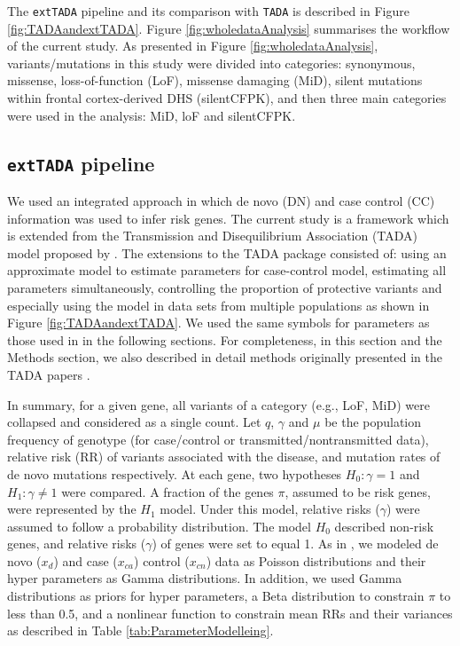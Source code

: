 \documentclass[]{article}
\begin{document}
The \texttt{extTADA} pipeline and its comparison with
\texttt{TADA} is described in Figure \ref{fig:TADAandextTADA}. Figure
\ref{fig:wholedataAnalysis} summarises the workflow of the
current study. As presented in  Figure \ref{fig:wholedataAnalysis},
variants/mutations in this study were divided into categories:
synonymous, missense, loss-of-function (LoF), missense damaging (MiD), silent mutations
within frontal cortex-derived DHS (silentCFPK), and
then three main categories were used in the analysis: MiD, loF and
silentCFPK.

\subsection{\texttt{extTADA} pipeline}

We used an integrated approach in which de novo (DN) and case control (CC)
information was used to infer risk genes. The current study is a
framework which is extended from the Transmission and Disequilibrium
Association (TADA) model proposed by
\cite{he2013integrated, de2014synaptic}. The extensions to
the TADA package consisted of: using an approximate model to estimate parameters
for case-control model, estimating all parameters simultaneously,
controlling the proportion of protective variants and especially using
the model in data sets from multiple populations as shown in Figure \ref{fig:TADAandextTADA}. We used the same
symbols for parameters as those used in \cite{he2013integrated, de2014synaptic} in the following
sections. For completeness, in this section and the Methods section, we also described in detail methods originally presented in the TADA papers \citep{he2013integrated,de2014synaptic}.


In summary, for a given gene, all variants of a category
(e.g., LoF, MiD) were collapsed and considered as a
single count. Let $q$, $\gamma$ and $\mu$ be the population frequency of
genotype (for case/control or transmitted/nontransmitted data),
relative risk (RR) of variants associated with the disease, and
mutation rates of de novo mutations respectively.
At each gene, two hypotheses $H_0:
  \gamma = 1$ and $H_1: \gamma \neq 1$ were compared. A fraction of the genes $\pi$, assumed to be risk genes, were represented by the $H_1$ model. Under this model, relative
  risks ($\gamma$) were assumed to follow a probability distribution.
The model $H_0$ described non-risk genes, and relative risks ($\gamma$)
  of genes were set to equal 1. As in
  \cite{he2013integrated}, we modeled de novo ($x_d$) and case
  ($x_{ca}$) control ($x_{cn}$) data as Poisson distributions and
  their hyper parameters as Gamma distributions. In addition, we
  used Gamma distributions as priors for hyper parameters, a Beta
  distribution to constrain $\pi$ to less than 0.5, and a
  nonlinear function to constrain mean RRs and their variances as described in Table
  \ref{tab:ParameterModelleing}.
\end{document}
